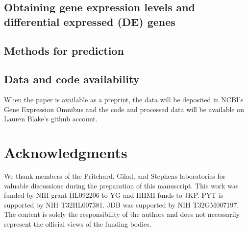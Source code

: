 \subsection{Obtaining gene expression levels and differential expressed (DE) genes}\label{illumina-high-throughput-sequencing}


\subsection{Methods for prediction}\label{read-mapping}



\subsection{Data and code
availability}\label{ch04-data-and-code-availability}

When the paper is available as a preprint, the data will be deposited in NCBI's Gene Expression Omnibus and the code and processed data will be available on Lauren Blake's github account. 

\section{Acknowledgments}\label{ch04-acknowledgments}

We thank members of the Pritchard, Gilad, and Stephens laboratories
for valuable discussions during the preparation of this
manuscript. This work was funded by NIH grant HL092206 to YG and HHMI
funds to JKP. PYT is supported by NIH T32HL007381. JDB was supported
by NIH T32GM007197.  The content is solely the responsibility of the
authors and does not necessarily represent the official views of the
funding bodies. 

